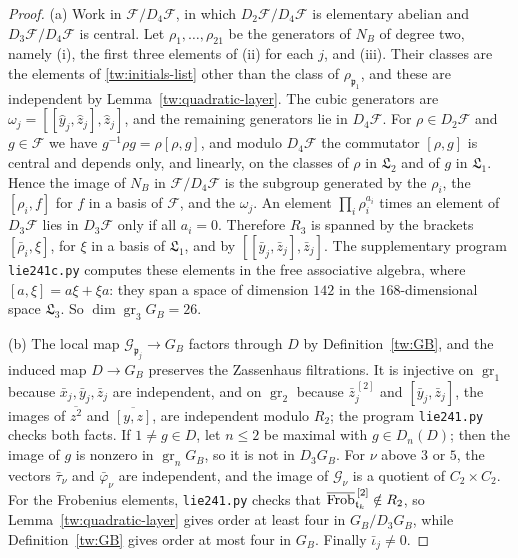 \begin{proof}
(a) Work in $\mathcal F/D_4\mathcal F$, in which $D_2\mathcal F/D_4\mathcal F$
is elementary abelian and $D_3\mathcal F/D_4\mathcal F$ is central. Let
$\rho_1,\dots,\rho_{21}$ be the generators of $N_B$ of degree two, namely
(i), the first three elements of (ii) for each $j$, and (iii). Their classes
are the elements of \eqref{tw:initials-list} other than the class of
$\rho_{\mathfrak p_1}$, and these are independent by
Lemma~\ref{tw:quadratic-layer}. The cubic generators are
$\omega_j=[[\hat y_j,\hat z_j],\hat z_j]$, and the remaining generators lie
in $D_4\mathcal F$. For $\rho\in D_2\mathcal F$ and $g\in\mathcal F$ we have
$g^{-1}\rho g=\rho[\rho,g]$, and modulo $D_4\mathcal F$ the commutator
$[\rho,g]$ is central and depends only, and linearly, on the classes of
$\rho$ in $\mathfrak L_2$ and of $g$ in $\mathfrak L_1$. Hence the image of
$N_B$ in $\mathcal F/D_4\mathcal F$ is the subgroup generated by the $\rho_i$,
the $[\rho_i,f]$ for $f$ in a basis of $\mathcal F$, and the $\omega_j$. An
element $\prod_i\rho_i^{a_i}$ times an element of $D_3\mathcal F$ lies in
$D_3\mathcal F$ only if all $a_i=0$. Therefore $R_3$ is spanned by the
brackets $[\bar\rho_i,\xi]$, for $\xi$ in a basis of $\mathfrak L_1$, and by
$[[\bar y_j,\bar z_j],\bar z_j]$. The supplementary program
\texttt{lie241c.py} computes these elements in the free associative algebra,
where $[a,\xi]=a\xi+\xi a$: they span a space of dimension $142$ in the
$168$-dimensional space $\mathfrak L_3$. So $\dim\operatorname{gr}_3G_B=26$.

(b) The local map $\mathcal G_{\mathfrak p_j}\to G_B$ factors through $D$ by
Definition~\ref{tw:GB}, and the induced map $D\to G_B$ preserves the
Zassenhaus filtrations. It is injective on $\operatorname{gr}_1$ because
$\bar x_j,\bar y_j,\bar z_j$ are independent, and on $\operatorname{gr}_2$
because $\bar z_j^{\,[2]}$ and $[\bar y_j,\bar z_j]$, the images of
$\overline{z^2}$ and $\overline{[y,z]}$, are independent modulo $R_2$; the
program \texttt{lie241.py} checks both facts. If $1\neq g\in D$, let $n\le2$
be maximal with $g\in D_n(D)$; then the image of $g$ is nonzero in
$\operatorname{gr}_nG_B$, so it is not in $D_3G_B$. For $\nu$ above $3$ or
$5$, the vectors $\bar\tau_\nu$ and $\bar\varphi_\nu$ are independent, and the
image of $\mathcal G_\nu$ is a quotient of $C_2\times C_2$. For the Frobenius
elements, \texttt{lie241.py} checks that
$\overline{\operatorname{Frob}}_{\mathfrak t_k}^{\,[2]}\notin R_2$, so
Lemma~\ref{tw:quadratic-layer} gives order at least four in $G_B/D_3G_B$,
while Definition~\ref{tw:GB} gives order at most four in $G_B$. Finally
$\bar\iota_j\neq0$.


\end{proof}
